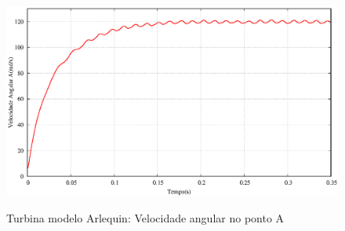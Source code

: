 \begin{figure}[!htbp]
	\caption{Turbina modelo Arlequin: Velocidade angular no ponto A}
	\centering 
	\includegraphics[scale=0.6,trim=0cm 0cm 0cm 0cm, clip=true]{Imagens/Cap7/turbina_arlq_velocidade_angular.eps}	
	\label{fig:turbina_arlq_velAngA}
\end{figure}

